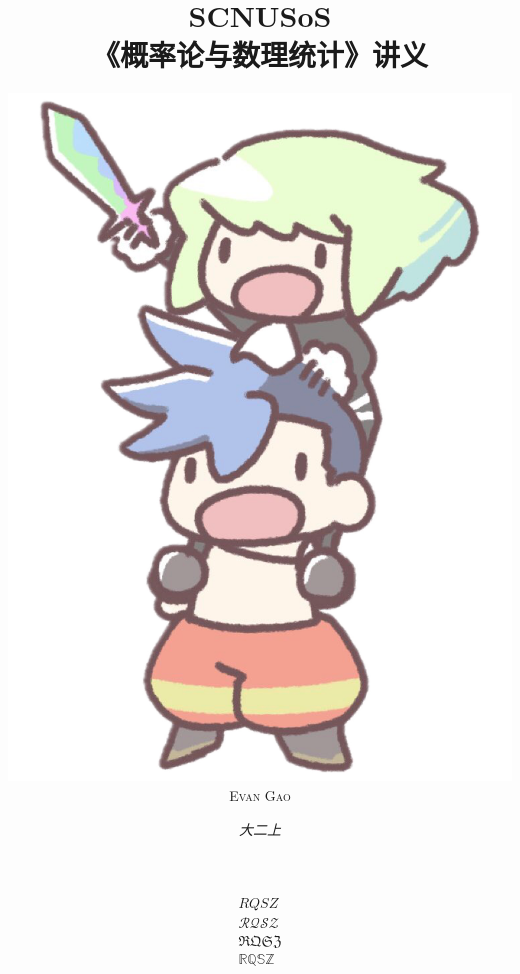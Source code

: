 \documentclass{report}
\title{\color{title_col}SCNUSoS\\\Huge\textbf{《概率论与数理统计》讲义}}
\author{\includegraphics[scale=.2]{assets/iconbg2.png}\\\huge{\textsc{\color{title_col}Evan Gao}}\\\email{evan@notch1p.xyz}}
\date{\textit{\color{title_col}大二上}\\\color{title_col}}
\begin{document}
\maketitle
\newpage%
\tableofcontents
\pagebreak

\begin{align*}
    RQSZ \\
    \mathcal{RQSZ} \\
    \mathfrak{RQSZ} \\
    \mathbb{RQSZ}
    \end{align*}
\end{document}
